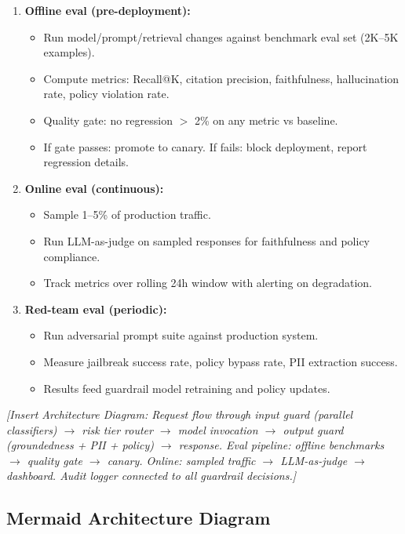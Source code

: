 \begin{enumerate}
  \item \textbf{Offline eval (pre-deployment):}
  \begin{itemize}
    \item Run model/prompt/retrieval changes against benchmark eval set (2K--5K examples).
    \item Compute metrics: Recall@K, citation precision, faithfulness, hallucination rate, policy violation rate.
    \item Quality gate: no regression $>$ 2\% on any metric vs baseline.
    \item If gate passes: promote to canary. If fails: block deployment, report regression details.
  \end{itemize}

  \item \textbf{Online eval (continuous):}
  \begin{itemize}
    \item Sample 1--5\% of production traffic.
    \item Run LLM-as-judge on sampled responses for faithfulness and policy compliance.
    \item Track metrics over rolling 24h window with alerting on degradation.
  \end{itemize}

  \item \textbf{Red-team eval (periodic):}
  \begin{itemize}
    \item Run adversarial prompt suite against production system.
    \item Measure jailbreak success rate, policy bypass rate, PII extraction success.
    \item Results feed guardrail model retraining and policy updates.
  \end{itemize}
\end{enumerate}

\textit{[Insert Architecture Diagram: Request flow through input guard (parallel classifiers) $\rightarrow$ risk tier router $\rightarrow$ model invocation $\rightarrow$ output guard (groundedness + PII + policy) $\rightarrow$ response. Eval pipeline: offline benchmarks $\rightarrow$ quality gate $\rightarrow$ canary. Online: sampled traffic $\rightarrow$ LLM-as-judge $\rightarrow$ dashboard. Audit logger connected to all guardrail decisions.]}

\subsection*{Mermaid Architecture Diagram}

